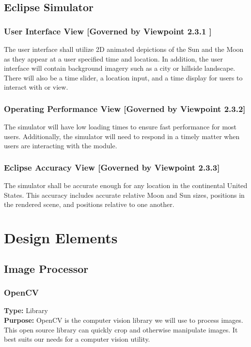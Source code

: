 \documentclass[10pt, onecolumn, draftclsnofoot, letterpaper, compsoc]{IEEEtran}
\begin{document}
\subsection{Eclipse Simulator}

  \subsubsection{User Interface View [Governed by Viewpoint 2.3.1 ]}
  The user interface shall utilize 2D animated depictions of
  the Sun and the Moon as they appear at a user specified
  time and location. In addition, the user interface will
  contain background imagery such as a city or hillside
  landscape. There will also be a time slider, a location
  input, and a time display for users to interact with or
  view. \\

  \subsubsection{Operating Performance View [Governed by Viewpoint 2.3.2]}
  The simulator will have low loading times to ensure fast
  performance for most users. Additionally, the simulator
  will need to respond in a timely matter when users are
  interacting with the module. \\

  \subsubsection{Eclipse Accuracy View [Governed by Viewpoint 2.3.3]}
  The simulator shall be accurate enough for any location in
  the continental United States. This accuracy includes
  accurate relative Moon and Sun sizes, positions in the
  rendered scene, and positions relative to one another. \\

\section{Design Elements}

\subsection{Image Processor}

\subsubsection{OpenCV}
\textbf{Type:} Library\\
\textbf{Purpose:} OpenCV is the computer vision library we will use to process
images. This open source library can quickly crop and otherwise manipulate
images. It best suits our needs for a computer vision utility.\\
\end{document}
